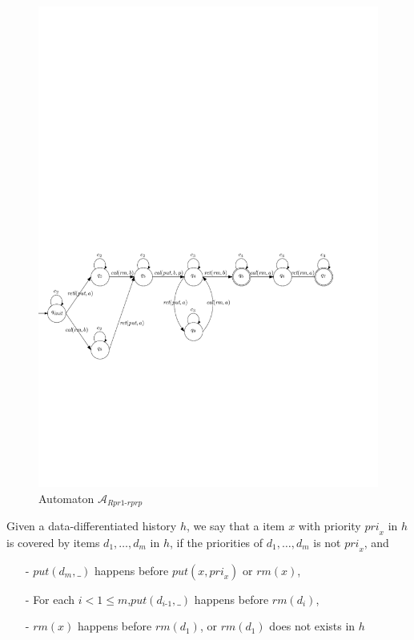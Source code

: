 \begin{figure}[htbp]
  \centering
  \includegraphics[width=1 \textwidth]{PIC_AUTO_UNMATCHED_Rpr1-rprp.pdf}
  \caption{Automaton $\mathcal{A}_{\textit{Rpr1-rprp}}$}
  \label{fig:automata for Rpro-rprp}
\end{figure}



Given a data-differentiated history $h$, we say that a item $x$ with priority $\textit{pri}_x$ in $h$ is covered by items $d_1,\ldots,d_m$ in $h$, if the priorities of $d_1,\ldots,d_m$ is not $\textit{pri}_x$, and

\begin{itemize}
\setlength{\itemsep}{0.5pt}
\item[-] $\textit{put}(d_m,\_)$ happens before $\textit{put}(x,\textit{pri}_x)$ or $\textit{rm}(x)$,

\item[-] For each $i < 1 \leq m$,$\textit{put}(d_{\textit{i-1}},\_)$ happens before $\textit{rm}(d_i)$,

\item[-] $\textit{rm}(x)$ happens before $\textit{rm}(d_1)$, or $\textit{rm}(d_1)$ does not exists in $h$
\end{itemize}

